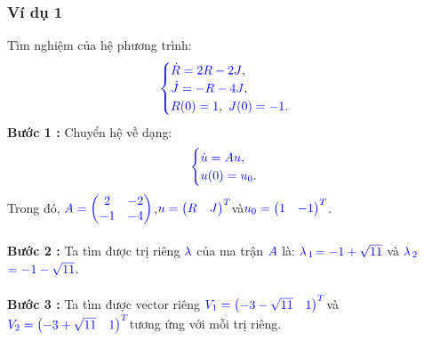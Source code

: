 \documentclass[a4paper]{article}
\begin{document}
\subsubsection{Ví dụ 1}
Tìm nghiệm của hệ phương trình:
\begin{align}
	    \textcolor{blue}{
	    \begin{cases}
            \dot R = 2R - 2J \textcolor{black}{,}\\
            \dot J = -R - 4J \textcolor{black}{,}\\
            R(0) = 1\textcolor{black}{,} \enskip J(0) = -1 \textcolor{black}{.}
        \end{cases}
        }
        \notag
	\end{align}
{\bfseries Bước 1 :} Chuyển hệ về dạng:
\begin{align}
	    \textcolor{blue}{
	    \begin{cases}
            \dot u = Au \textcolor{black}{,}\\
            u(0) = u\sb{0}\textcolor{black}{.}
        \end{cases}
        }
        \notag
	\end{align}
Trong đó,  $\textcolor{blue}{A = \begin{pmatrix} 2 & -2\\ -1 & -4 \end{pmatrix}}$,\enskip $\textcolor{blue}{u = \begin{pmatrix} R & J \end{pmatrix}\sp{T}}$\enskip và\enskip $\textcolor{blue}{u\sb{0} = \begin{pmatrix} 1 & -1 \end{pmatrix}\sp{T}}$.\\\\
{\bfseries Bước 2 :} Ta tìm được trị riêng $\textcolor{blue}{\lambda}$ của ma trận $\textcolor{blue}{A}$ là: $\textcolor{blue}{\lambda}$$\textcolor{blue}{\sb{1}}$$\textcolor{blue}{=-1+\sqrt{11}}$ và $\textcolor{blue}{\lambda}$$\textcolor{blue}{\sb{2}}$$\textcolor{blue}{=-1-\sqrt{11}}$.\\\\
{\bfseries Bước 3 :} Ta tìm được vector riêng \enskip $\textcolor{blue}{V\sb{1} = \begin{pmatrix} -3-\sqrt{11} & 1 \end{pmatrix}\sp{T}}$\enskip và \enskip $\textcolor{blue}{V\sb{2} = \begin{pmatrix} -3+\sqrt{11} & 1 \end{pmatrix}\sp{T}}$\enskip tương ứng với mỗi trị riêng.\\\\
\end{document}
